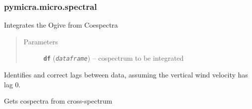 \documentclass[a4paper,10pt,oneside]{sphinxmanual}
\begin{document}
\subsubsection{pymicra.micro.spectral}
\label{pymicra.micro:pymicra-micro-spectral}\label{pymicra.micro:module-pymicra.micro.spectral}

\begin{fulllineitems}
\label{pymicra.micro:pymicra.micro.spectral.Ogive}
Integrates the Ogive from Coespectra
\begin{quote}\begin{description}
\item[{Parameters}] \leavevmode
\textbf{\texttt{df}} (\emph{\texttt{dataframe}}) -- cospectrum to be integrated

\end{description}\end{quote}

\end{fulllineitems}


\begin{fulllineitems}
\label{pymicra.micro:pymicra.micro.spectral.correctLag}
Identifies and correct lags between data, assuming the
vertical wind velocity has lag 0.

\end{fulllineitems}


\begin{fulllineitems}
\label{pymicra.micro:pymicra.micro.spectral.cospectra}
Gets cospectra from cross-spectrum

\end{fulllineitems}

\end{document}

